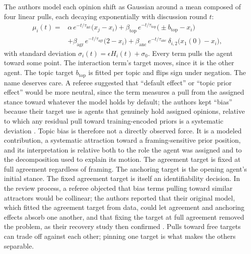 \documentclass[11pt]{article}
\theoremstyle{definition}
\theoremstyle{remark}
\begin{document}
The authors model each opinion shift as Gaussian around a mean composed of four linear pulls, each decaying exponentially with discussion round $t$:
\begin{equation}
\begin{aligned}
\mu_i(t) ={}& \alpha\, e^{-t/\tau_{\mathrm{int}}}\big(x_j - x_i\big)
+ \beta_{\mathrm{top}}\, e^{-t/\tau_{\mathrm{top}}}\big(\pm b_{\mathrm{top}} - x_i\big)\\
&+ \beta_{\mathrm{agr}}\, e^{-t/\tau_{\mathrm{agr}}}\big(2 - x_i\big)
+ \beta_{\mathrm{anc}}\, e^{-t/\tau_{\mathrm{anc}}}\,\delta_{i,2}\big(x_1(0) - x_i\big),
\end{aligned}
\end{equation}
with standard deviation $\sigma_i(t) = \epsilon H_i(t) + \sigma_0$. Every term pulls the agent toward some point. The interaction term's target moves, since it is the other agent. The topic target $b_{\mathrm{top}}$ is fitted per topic and flips sign under negation. The name deserves care. A referee suggested that ``default effect'' or ``topic prior effect'' would be more neutral, since the term measures a pull from the assigned stance toward whatever the model holds by default; the authors kept ``bias'' because their target use is agents that genuinely hold assigned opinions, relative to which any residual pull toward training-encoded priors is a systematic deviation \cite{brockers2026peer}. Topic bias is therefore not a directly observed force. It is a modeled contribution, a systematic attraction toward a framing-sensitive prior position, and its interpretation is relative both to the role the agent was assigned and to the decomposition used to explain its motion. The agreement target is fixed at full agreement regardless of framing. The anchoring target is the opening agent's initial stance. The fixed agreement target is itself an identifiability decision. In the review process, a referee objected that bias terms pulling toward similar attractors would be collinear; the authors reported that their original model, which fitted the agreement target from data, could let agreement and anchoring effects absorb one another, and that fixing the target at full agreement removed the problem, as their recovery study then confirmed \cite{brockers2026peer}. Pulls toward free targets can trade off against each other; pinning one target is what makes the others separable.
\end{document}
